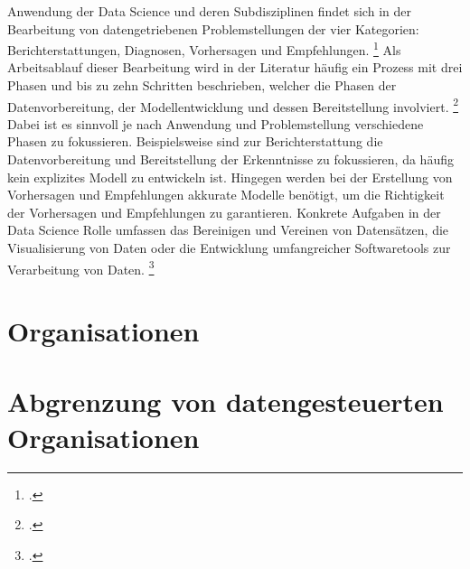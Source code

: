 Anwendung der Data Science und deren Subdisziplinen findet sich in der Bearbeitung von datengetriebenen Problemstellungen der vier Kategorien: Berichterstattungen, Diagnosen, Vorhersagen und Empfehlungen. \footcite[prenote][postnote]{four main categories}
Als Arbeitsablauf dieser Bearbeitung wird in der Literatur häufig ein Prozess mit drei Phasen und bis zu zehn Schritten beschrieben, welcher die Phasen der Datenvorbereitung, der Modellentwicklung und dessen Bereitstellung involviert. \footcite[prenote][postnote]{data science process as roughly 3}
Dabei ist es sinnvoll je nach Anwendung und Problemstellung verschiedene Phasen zu fokussieren.
Beispielsweise sind zur Berichterstattung die Datenvorbereitung und Bereitstellung der Erkenntnisse zu fokussieren, da häufig kein explizites Modell zu entwickeln ist.
Hingegen werden bei der Erstellung von Vorhersagen und Empfehlungen akkurate Modelle benötigt, um die Richtigkeit der Vorhersagen und Empfehlungen zu garantieren.
Konkrete Aufgaben in der Data Science Rolle umfassen das Bereinigen und Vereinen von Datensätzen, die Visualisierung von Daten oder die Entwicklung umfangreicher Softwaretools zur Verarbeitung von Daten. \footcite[prenote][postnote]{tasks of a data scientist}

\section{Organisationen}

\section{Abgrenzung von datengesteuerten Organisationen}